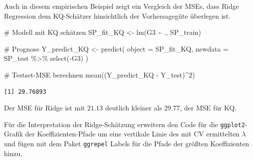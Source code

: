 \documentclass[
  a4paper,
  DIV=11,
  oneside]{scrreprt}
\newenvironment{Shaded}{\begin{snugshade}}{\end{snugshade}}
\newcommand{\AttributeTok}[1]{\textcolor[rgb]{0.40,0.45,0.13}{#1}}
\newcommand{\CommentTok}[1]{\textcolor[rgb]{0.37,0.37,0.37}{#1}}
\newcommand{\DecValTok}[1]{\textcolor[rgb]{0.68,0.00,0.00}{#1}}
\newcommand{\FunctionTok}[1]{\textcolor[rgb]{0.28,0.35,0.67}{#1}}
\newcommand{\NormalTok}[1]{\textcolor[rgb]{0.00,0.23,0.31}{#1}}
\newcommand{\OtherTok}[1]{\textcolor[rgb]{0.00,0.23,0.31}{#1}}
\newcommand{\SpecialCharTok}[1]{\textcolor[rgb]{0.37,0.37,0.37}{#1}}
\begin{document}
Auch in diesem empirischen Beispiel zeigt ein Vergleich der MSEs, dass
Ridge Regression dem KQ-Schätzer hinsichtlich der Vorhersagegüte
überlegen ist.

\begin{Shaded}
\begin{Highlighting}[]
\CommentTok{\# Modell mit KQ schätzen}
\NormalTok{SP\_fit\_KQ }\OtherTok{\textless{}{-}} \FunctionTok{lm}\NormalTok{(G3 }\SpecialCharTok{\textasciitilde{}}\NormalTok{ ., SP\_train)}

\CommentTok{\# Prognose}
\NormalTok{Y\_predict\_KQ }\OtherTok{\textless{}{-}} \FunctionTok{predict}\NormalTok{(}
  \AttributeTok{object =}\NormalTok{ SP\_fit\_KQ, }
  \AttributeTok{newdata =}\NormalTok{ SP\_test }\SpecialCharTok{\%\textgreater{}\%} 
    \FunctionTok{select}\NormalTok{(}\SpecialCharTok{{-}}\NormalTok{G3)}
\NormalTok{)}

\CommentTok{\# Testset{-}MSE berechnen}
\FunctionTok{mean}\NormalTok{((Y\_predict\_KQ }\SpecialCharTok{{-}}\NormalTok{ Y\_test)}\SpecialCharTok{\^{}}\DecValTok{2}\NormalTok{)}
\end{Highlighting}
\end{Shaded}

\begin{verbatim}
[1] 29.76893
\end{verbatim}

Der MSE für Ridge ist mit \(21.13\) deutlich kleiner als \(29.77\), der
MSE für KQ.

Für die Interpretation der Ridge-Schätzung erweitern den Code für die
\texttt{ggplot2}-Grafik der Koeffizienten-Pfade um eine vertikale Linie
des mit CV ermittelten \(\lambda\) und fügen mit dem Paket
\texttt{ggrepel} Labels für die Pfade der größten Koeffizienten hinzu.
\end{document}
